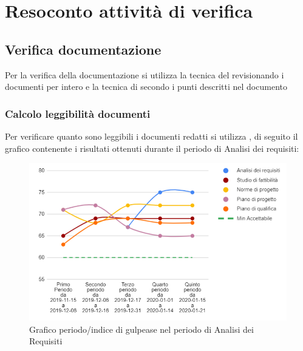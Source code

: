 \section{Resoconto attività di verifica}

\subsection{Verifica documentazione}
Per la verifica della documentazione si utilizza la tecnica del  revisionando i documenti per intero e la tecnica di  secondo i punti descritti nel documento 

\subsubsection{Calcolo leggibilità documenti}
Per verificare quanto sono leggibili i documenti redatti si utilizza , di seguito il grafico contenente i risultati ottenuti durante il periodo di Analisi dei requisiti:

\begin{figure}[H]
	\centering
	\includegraphics[width=0.8\linewidth]{./res/images/gulpease.png}
	\caption{Grafico periodo/indice di gulpease nel periodo di Analisi dei Requisiti}
	\label{fig:Grafico indice di gulpease periodo di Analisi dei Requisiti}
\end{figure}